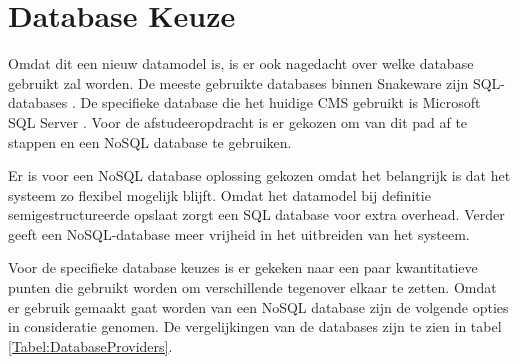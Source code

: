 \section{Database Keuze}
Omdat dit een nieuw datamodel is, is er ook nagedacht over welke database gebruikt zal worden.
De meeste gebruikte databases binnen Snakeware zijn SQL-databases \parencite{SQL}.
De specifieke database die het huidige CMS gebruikt is Microsoft SQL Server \parencite{MSQLServer}.
Voor de afstudeeropdracht is er gekozen om van dit pad af te stappen en een NoSQL \parencite{NoSQL} database te gebruiken.

\whitespace
Er is voor een NoSQL database oplossing gekozen omdat het belangrijk is dat het systeem zo flexibel mogelijk blijft.
Omdat het datamodel bij definitie semigestructureerde opslaat zorgt een SQL database voor extra overhead.
Verder geeft een NoSQL-database meer vrijheid in het uitbreiden van het systeem.

\whitespace
Voor de specifieke database keuzes is er gekeken naar een paar kwantitatieve punten die gebruikt worden om verschillende tegenover elkaar te zetten.
Omdat er gebruik gemaakt gaat worden van een NoSQL database zijn de volgende opties in consideratie genomen.
De vergelijkingen van de databases zijn te zien in tabel \ref{Tabel:DatabaseProviders}.


